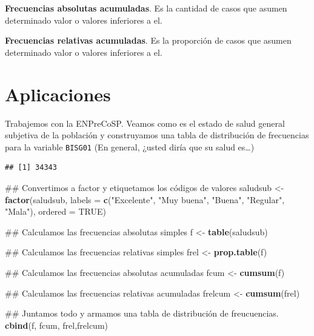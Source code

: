 \documentclass[spanish,]{book}
\newenvironment{Shaded}{\begin{snugshade}}{\end{snugshade}}
\newcommand{\KeywordTok}[1]{\textcolor[rgb]{0.13,0.29,0.53}{\textbf{#1}}}
\newcommand{\DataTypeTok}[1]{\textcolor[rgb]{0.13,0.29,0.53}{#1}}
\newcommand{\StringTok}[1]{\textcolor[rgb]{0.31,0.60,0.02}{#1}}
\newcommand{\OtherTok}[1]{\textcolor[rgb]{0.56,0.35,0.01}{#1}}
\newcommand{\OperatorTok}[1]{\textcolor[rgb]{0.81,0.36,0.00}{\textbf{#1}}}
\newcommand{\NormalTok}[1]{#1}
\begin{document}
\textbf{Frecuencias absolutas acumuladas}. Es la cantidad de casos que
asumen determinado valor o valores inferiores a el.

\textbf{Frecuencias relativas acumuladas}. Es la proporción de casos que
asumen determinado valor o valores inferiores a el.

\section{Aplicaciones}\label{aplicaciones}

Trabajemos con la ENPreCoSP. Veamos como es el estado de salud general
subjetiva de la población y construyamos una tabla de distribución de
frecuencias para la variable \texttt{BISG01} (En general, ¿usted diría
que su salud es\ldots{})

\begin{Shaded}
\end{Shaded}

\begin{verbatim}
## [1] 34343
\end{verbatim}

\begin{Shaded}
\begin{Highlighting}[]
\NormalTok{## Convertimos a factor y etiquetamos los códigos de valores}
\NormalTok{saludsub <-}\StringTok{ }\KeywordTok{factor}\NormalTok{(saludsub,}
                   \DataTypeTok{labels =} \KeywordTok{c}\NormalTok{(}\StringTok{"Excelente"}\NormalTok{, }\StringTok{"Muy buena"}\NormalTok{, }\StringTok{"Buena"}\NormalTok{, }\StringTok{"Regular"}\NormalTok{, }\StringTok{"Mala"}\NormalTok{),}
                   \DataTypeTok{ordered =} \OtherTok{TRUE}\NormalTok{)}

\NormalTok{## Calculamos las frecuencias absolutas simples}
\NormalTok{f <-}\StringTok{ }\KeywordTok{table}\NormalTok{(saludsub)}

\NormalTok{## Calculamos las frecuencias relativas simples}
\NormalTok{frel <-}\StringTok{ }\KeywordTok{prop.table}\NormalTok{(f)}

\NormalTok{## Calculamos las frecuencias absolutas acumuladas}
\NormalTok{fcum <-}\StringTok{ }\KeywordTok{cumsum}\NormalTok{(f)}

\NormalTok{## Calculamos las frecuencias relativas acumuladas}
\NormalTok{frelcum <-}\StringTok{ }\KeywordTok{cumsum}\NormalTok{(frel)}

\NormalTok{## Juntamos todo y armamos una tabla de distribución de freucuencias.}
\KeywordTok{cbind}\NormalTok{(f, fcum, frel,frelcum)}
\end{Highlighting}
\end{Shaded}
\end{document}
